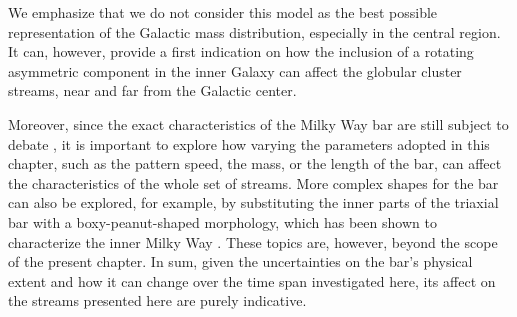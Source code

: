         We emphasize that we do not consider this model as the best possible representation of the Galactic mass distribution, especially in the central region. It can, however, provide a first indication on how the inclusion of a rotating asymmetric component in the inner Galaxy can affect the globular cluster streams, near and far from the Galactic center. 

        Moreover, since the exact characteristics of the Milky Way bar are still subject to debate \citep[see, e.g.,][]{2016ARA&A..54..529B}, it is important to explore how varying the parameters adopted in this chapter, such as the pattern speed, the mass, or the length of the bar, can affect the characteristics of the whole set of streams.  More complex shapes for the bar can also be explored, for example, by substituting the inner parts of the triaxial bar with a boxy-peanut-shaped morphology, which has been shown to characterize the inner Milky Way  \citep[see, e.g., ][]{2013MNRAS.435.1874W, 2015MNRAS.450.4050W}. These topics are, however, beyond the scope of the present chapter. In sum, given the uncertainties on the bar's physical extent and how it can change over the time span investigated here, its affect on the streams presented here are purely indicative. 


